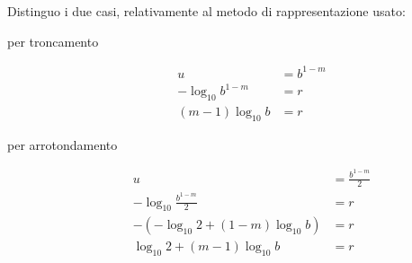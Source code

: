 Distinguo i due casi, relativamente al metodo di rappresentazione usato:
\begin{description}
	\item[per troncamento] 
		\begin{displaymath}
		\begin{split}
			u &= b^{1-m} \\
			-\log_{10}{b^{1-m}} &= r \\
			(m-1)\log_{10}{b} &= r
		\end{split}
		\end{displaymath}

	\item[per arrotondamento] 
		\begin{displaymath}
		\begin{split}
			u &= \frac{b^{1-m}}{2} \\
			-\log_{10}{\frac{b^{1-m}}{2}} &= r \\
			-\left( -\log_{10}{2} + (1-m)\log_{10}{b} \right) &= r \\
			\log_{10}{2} + (m-1)\log_{10}{b} &= r
		\end{split}
		\end{displaymath}
\end{description}


